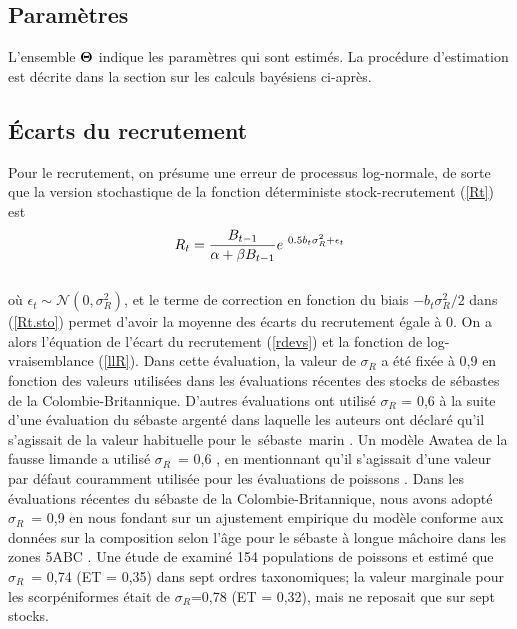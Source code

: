 \documentclass[11pt]{book}
\newcommand{\Norm}{\mathcal{N}}%
\def\bfTh{{\bf \Theta}}%
\newcommand{\angL}{\guillemotleft\,}
\newcommand{\angR}{\,\guillemotright}
\def\minus{%
  \setbox0=\hbox{-}%
  \vcenter{%
    \hrule width\wd0 height 0.05pt%
  }%
}
\def\bfTh{{\bf \Theta}}          %
\def\vsd{\vspace*{1ex}}     %
\newcommand{\eref}[1]{(\ref{#1})}
\renewcommand{\eb}{\vsd \vsd \begin{eqnarray}}
\renewcommand{\ee}{\end{eqnarray} \vsd }
\begin{document}
\subsection{Param\`{e}tres}

L'ensemble $\bfTh$ indique les param\`{e}tres qui sont estim\'{e}s. 
La proc\'{e}dure d'estimation est d\'{e}crite dans la section sur les calculs bay\'{e}siens ci-apr\`{e}s.

\subsection{\'{E}carts du recrutement}

Pour le recrutement, on pr\'{e}sume une erreur de processus log-normale, de sorte que la version stochastique de la fonction d\'{e}terministe stock-recrutement (\ref{Rt}) est
\eb
R_t = \frac{B_{t-1}}{\alpha + \beta B_{t-1}} e^{\minus 0.5 b_t \sigma_R^2 + \epsilon_t} \label{Rt.sto}
\ee \\[-0.25ex]


o\`{u} $\epsilon_t \sim \Norm(0, \sigma_R^2)$, et le terme de correction en fonction du biais $-b_t \sigma_R^2/2$ dans \eref{Rt.sto} permet d'avoir la moyenne des \'{e}carts du recrutement \'{e}gale \`{a} 0. On a alors l'\'{e}quation de l'\'{e}cart du recrutement (\ref{rdevs}) et la fonction de log-vraisemblance (\ref{llR}). 
Dans cette \'{e}valuation, la valeur de $\sigma_R$ a \'{e}t\'{e} fix\'{e}e \`{a} 0,9 en fonction des valeurs utilis\'{e}es dans les \'{e}valuations r\'{e}centes des stocks de s\'{e}bastes de la Colombie-Britannique.
D'autres \'{e}valuations ont utilis\'{e} $\sigma_R$ = 0,6 \`{a} la suite d'une \'{e}valuation du s\'{e}baste argent\'{e} \citep{Starr-etal:2016_sgr} dans laquelle les auteurs ont d\'{e}clar\'{e} qu'il s'agissait de la valeur habituelle pour le \angL{}s\'{e}baste\angR{} marin \citep{Mertz-Myers:1996}.
Un mod\`{e}le Awatea de la fausse limande a utilis\'{e} $\sigma_R$~= 0,6 \citep{Holt-etal:2016_rol}, en mentionnant qu'il s'agissait d'une valeur par d\'{e}faut couramment utilis\'{e}e pour les \'{e}valuations de poissons \citep{Beddington-Cooke:1983}.
Dans les \'{e}valuations r\'{e}centes du s\'{e}baste de la Colombie-Britannique, nous avons adopt\'{e} $\sigma_R$~= 0,9 en nous fondant sur un ajustement empirique du mod\`{e}le conforme aux donn\'{e}es sur la composition selon l'\^{a}ge pour le s\'{e}baste \`{a} longue m\^{a}choire dans les zones 5ABC \citep{Edwards-etal:2012_pop5ABC}.
Une \'{e}tude de \citet{Thorson-etal:2014} examin\'{e} 154 populations de poissons et estim\'{e} que $\sigma_R$~= 0,74 (ET = 0,35) dans sept ordres taxonomiques; la valeur marginale pour les scorp\'{e}niformes \'{e}tait de $\sigma_R$=0,78 (ET = 0,32), mais ne reposait que sur sept stocks.
\end{document}
